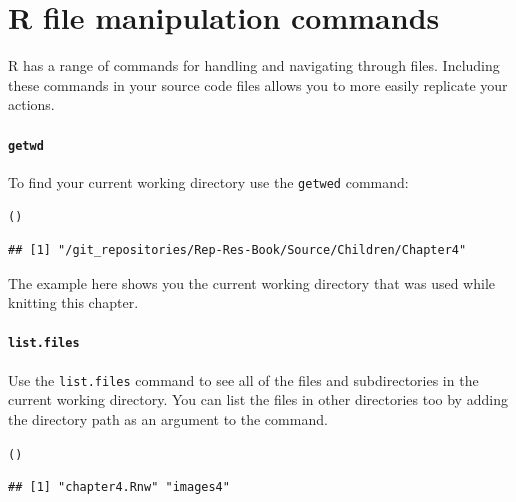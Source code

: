 \documentclass[krantz1]{krantz}
\begin{document}
\section{R file manipulation commands}

R has a range of commands for handling and navigating through files. Including these commands in your source code files allows you to more easily replicate your actions.

\paragraph{{\tt{getwd}}}

To find your current working directory use the \texttt{getwed} command:

\begin{knitrout}
\color{fgcolor}\begin{kframe}
\begin{alltt}
()
\end{alltt}
\begin{verbatim}
## [1] "/git_repositories/Rep-Res-Book/Source/Children/Chapter4"
\end{verbatim}
\end{kframe}
\end{knitrout}


\noindent The example here shows you the current working directory that was used while knitting this chapter.

\paragraph{{\tt{list.files}}}

Use the \texttt{list.files} command to see all of the files and subdirectories in the current working directory. You can list the files in other directories too by adding the directory path as an argument to the command. 

\begin{knitrout}
\color{fgcolor}\begin{kframe}
\begin{alltt}
()
\end{alltt}
\begin{verbatim}
## [1] "chapter4.Rnw" "images4"
\end{verbatim}
\end{kframe}
\end{knitrout}
\end{document}
